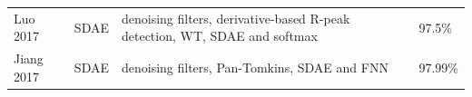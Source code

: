 \documentclass[journal]{IEEEtran}
\begin{document}
\begin{table}[!t]
\begin{minipage}{\textwidth}
\begin{tabularx}{\textwidth}{l c l l}
			Luo 2017\cite{luo2017patient}                  & SDAE           & denoising filters, derivative-based R-peak detection, WT, SDAE and softmax                                 & 97.5\%                                                                                                                                                                                                                                                                                                                                                                                                                                                                                                                                                                                                                                                                                                                                                                                                                                                                                                   \\
			Jiang 2017\cite{jiang2017heartbeat}            & SDAE           & denoising filters, Pan-Tomkins, SDAE and FNN                                                               & 97.99\%                                                                                                                                                                                                                                                                                                                                                                                                                                                                                                                                                                                                                                                                                                                                                                                                                                                                                                  \\

\end{tabularx}
\end{minipage}
\end{table}
\end{document}
